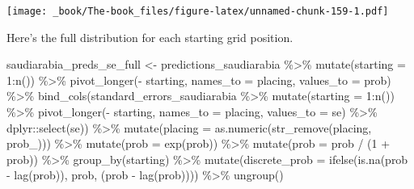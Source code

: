 \documentclass[
]{book}
\newenvironment{Shaded}{\begin{snugshade}}{\end{snugshade}}
\newcommand{\AttributeTok}[1]{\textcolor[rgb]{0.77,0.63,0.00}{#1}}
\newcommand{\DecValTok}[1]{\textcolor[rgb]{0.00,0.00,0.81}{#1}}
\newcommand{\FunctionTok}[1]{\textcolor[rgb]{0.00,0.00,0.00}{#1}}
\newcommand{\NormalTok}[1]{#1}
\newcommand{\OtherTok}[1]{\textcolor[rgb]{0.56,0.35,0.01}{#1}}
\newcommand{\SpecialCharTok}[1]{\textcolor[rgb]{0.00,0.00,0.00}{#1}}
\newcommand{\StringTok}[1]{\textcolor[rgb]{0.31,0.60,0.02}{#1}}
\begin{document}
\texttt{[image: \_book/The-book\_files/figure-latex/unnamed-chunk-159-1.pdf]}

Here's the full distribution for each starting grid position.

\begin{Shaded}
\begin{Highlighting}[]
\NormalTok{saudiarabia\_preds\_se\_full }\OtherTok{\textless{}{-}}\NormalTok{ predictions\_saudiarabia }\SpecialCharTok{\%\textgreater{}\%}
  \FunctionTok{mutate}\NormalTok{(}\AttributeTok{starting =} \DecValTok{1}\SpecialCharTok{:}\FunctionTok{n}\NormalTok{()) }\SpecialCharTok{\%\textgreater{}\%}
  \FunctionTok{pivot\_longer}\NormalTok{(}\SpecialCharTok{{-}}\NormalTok{ starting, }\AttributeTok{names\_to =} \StringTok{\textquotesingle{}placing\textquotesingle{}}\NormalTok{, }\AttributeTok{values\_to =} \StringTok{\textquotesingle{}prob\textquotesingle{}}\NormalTok{) }\SpecialCharTok{\%\textgreater{}\%} 
  \FunctionTok{bind\_cols}\NormalTok{(standard\_errors\_saudiarabia }\SpecialCharTok{\%\textgreater{}\%} \FunctionTok{mutate}\NormalTok{(}\AttributeTok{starting =} \DecValTok{1}\SpecialCharTok{:}\FunctionTok{n}\NormalTok{()) }\SpecialCharTok{\%\textgreater{}\%}
  \FunctionTok{pivot\_longer}\NormalTok{(}\SpecialCharTok{{-}}\NormalTok{ starting, }\AttributeTok{names\_to =} \StringTok{\textquotesingle{}placing\textquotesingle{}}\NormalTok{, }\AttributeTok{values\_to =} \StringTok{\textquotesingle{}se\textquotesingle{}}\NormalTok{) }\SpecialCharTok{\%\textgreater{}\%}
\NormalTok{    dplyr}\SpecialCharTok{::}\FunctionTok{select}\NormalTok{(se)) }\SpecialCharTok{\%\textgreater{}\%}
  \FunctionTok{mutate}\NormalTok{(}\AttributeTok{placing =} \FunctionTok{as.numeric}\NormalTok{(}\FunctionTok{str\_remove}\NormalTok{(placing, }\StringTok{\textquotesingle{}prob\_\textquotesingle{}}\NormalTok{))) }\SpecialCharTok{\%\textgreater{}\%}
  \FunctionTok{mutate}\NormalTok{(}\AttributeTok{prob =} \FunctionTok{exp}\NormalTok{(prob)) }\SpecialCharTok{\%\textgreater{}\%}
  \FunctionTok{mutate}\NormalTok{(}\AttributeTok{prob =}\NormalTok{ prob }\SpecialCharTok{/}\NormalTok{ (}\DecValTok{1} \SpecialCharTok{+}\NormalTok{ prob)) }\SpecialCharTok{\%\textgreater{}\%}
  \FunctionTok{group\_by}\NormalTok{(starting) }\SpecialCharTok{\%\textgreater{}\%} 
  \FunctionTok{mutate}\NormalTok{(}\AttributeTok{discrete\_prob =} \FunctionTok{ifelse}\NormalTok{(}\FunctionTok{is.na}\NormalTok{(prob }\SpecialCharTok{{-}} \FunctionTok{lag}\NormalTok{(prob)), prob, (prob }\SpecialCharTok{{-}} \FunctionTok{lag}\NormalTok{(prob)))) }\SpecialCharTok{\%\textgreater{}\%}
  \FunctionTok{ungroup}\NormalTok{()}


\end{Highlighting}
\end{Shaded}
\end{document}
